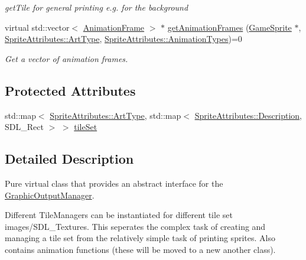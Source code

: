 \begin{DoxyCompactItemize}
\begin{DoxyCompactList}\small\item\em get\+Tile for general printing e.\+g. for the background \end{DoxyCompactList}\item 
\mbox{\label{class_tile_manager_aef74e8eb370f1b61729144ab67132735}} 
virtual std\+::vector$<$ \mbox{\hyperlink{class_animation_frame}{Animation\+Frame}} $>$ $\ast$ \mbox{\hyperlink{class_tile_manager_aef74e8eb370f1b61729144ab67132735}{get\+Animation\+Frames}} (\mbox{\hyperlink{class_game_sprite}{Game\+Sprite}} $\ast$, \mbox{\hyperlink{namespace_sprite_attributes_afb5447c311bc29f0ce8ddfd025c6e998}{Sprite\+Attributes\+::\+Art\+Type}}, \mbox{\hyperlink{namespace_sprite_attributes_ae1a753cb32f500b34381aac4b197b3a7}{Sprite\+Attributes\+::\+Animation\+Types}})=0
\begin{DoxyCompactList}\small\item\em Get a vector of animation frames. \end{DoxyCompactList}\end{DoxyCompactItemize}
\subsection*{Protected Attributes}
\begin{DoxyCompactItemize}
\item 
std\+::map$<$ \mbox{\hyperlink{namespace_sprite_attributes_afb5447c311bc29f0ce8ddfd025c6e998}{Sprite\+Attributes\+::\+Art\+Type}}, std\+::map$<$ \mbox{\hyperlink{namespace_sprite_attributes_a3ece96d6288b14d53d84e2138392395c}{Sprite\+Attributes\+::\+Description}}, S\+D\+L\+\_\+\+Rect $>$ $>$ \mbox{\hyperlink{class_tile_manager_a0ac2270018950604d7f6c817cc17434d}{tile\+Set}}
\end{DoxyCompactItemize}


\subsection{Detailed Description}
Pure virtual class that provides an abstract interface for the \mbox{\hyperlink{class_graphic_output_manager}{Graphic\+Output\+Manager}}. 

Different Tile\+Managers can be instantiated for different tile set images/\+S\+D\+L\+\_\+\+Textures. This seperates the complex task of creating and managing a tile set from the relatively simple task of printing sprites. Also contains animation functions (these will be moved to a new another class). 

